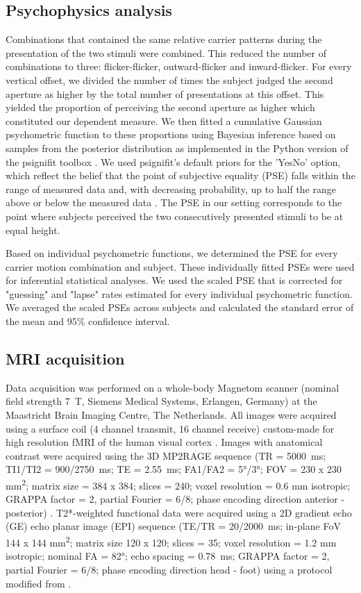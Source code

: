 \subsection{Psychophysics analysis}
Combinations that contained the same relative carrier patterns during the presentation of the two stimuli were combined. This reduced the number of combinations to three: flicker-flicker, outward-flicker and inward-flicker. For every vertical offset, we divided the number of times the subject judged the second aperture as higher by the total number of presentations at this offset. This yielded the proportion of perceiving the second aperture as higher which constituted our dependent measure. We then fitted a cumulative Gaussian psychometric function to these proportions using Bayesian inference based on samples from the posterior distribution as implemented in the Python version of the psignifit toolbox \parencite{Frund2011}. We used psignifit's default priors for the 'YesNo' option, which reflect the belief that the point of subjective equality (PSE) falls within the range of measured data and, with decreasing probability, up to half the range above or below the measured data \parencite{Frund2011}. The PSE in our setting corresponds to the point where subjects perceived the two consecutively presented stimuli to be at equal height.

Based on individual psychometric functions, we determined the PSE for every carrier motion combination and subject. These individually fitted PSEs were used for inferential statistical analyses. We used the scaled PSE that is corrected for "guessing" and "lapse" rates estimated for every individual psychometric function. We averaged the scaled PSEs across subjects and calculated the standard error of the mean and 95\% confidence interval.

\subsection{MRI acquisition}
Data acquisition was performed on a whole-body Magnetom scanner (nominal field strength 7~T, Siemens Medical Systems, Erlangen, Germany) at the Maastricht Brain Imaging Centre, The Netherlands. All images were acquired using a surface coil (4 channel transmit, 16 channel receive) custom-made for high resolution fMRI of the human visual cortex \parencite{Sengupta2016}. Images with anatomical contrast were acquired using the 3D MP2RAGE sequence (TR = 5000~ms; TI1/TI2 = 900/2750~ms; TE = 2.55~ms; FA1/FA2 = 5°/3°; FOV = 230 x 230 mm\textsuperscript{2}; matrix size = 384 x 384; slices = 240; voxel resolution = 0.6 mm isotropic; GRAPPA factor = 2, partial Fourier = 6/8; phase encoding direction anterior - posterior) \parencite{Marques2010}. T2*-weighted functional data were acquired using a 2D gradient echo (GE) echo planar image (EPI) sequence (TE/TR = 20/2000~ms; in-plane FoV 144 x 144 mm\textsuperscript{2}; matrix size 120 x 120; slices = 35; voxel resolution = 1.2 mm isotropic; nominal FA = 82°; echo spacing = 0.78~ms; GRAPPA factor = 2, partial Fourier = 6/8; phase encoding direction head - foot) using a protocol modified from \cite{Feinberg2010, Setsompop2012, Moeller2010}.

